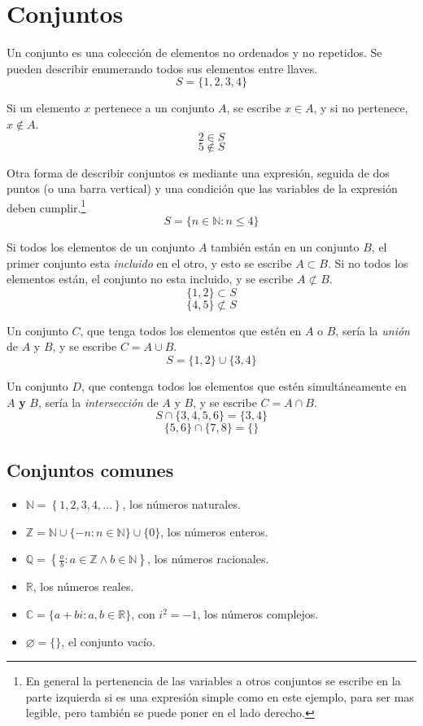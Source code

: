 \documentclass[../teoria.root.tex]{subfiles}
\begin{document}
\section{Conjuntos}

Un conjunto es una colección de elementos no ordenados y no repetidos. Se
pueden describir enumerando todos sus elementos entre llaves.
\[S=\{1,2,3,4\}\]

Si un elemento $x$ pertenece a un conjunto $A$, se escribe $x\in A$, y si no
pertenece, $x\notin A$.
\[2\in S\]
\[5\notin S\]

Otra forma de describir conjuntos es mediante una expresión, seguida de dos
puntos (o una barra vertical) y una condición que las variables de la expresión
deben cumplir.\footnote{En general la pertenencia de las variables a otros
conjuntos se escribe en la parte izquierda si es una expresión simple como en
este ejemplo, para ser mas legible, pero también se puede poner en el lado
derecho.}
\[S=\{n\in\mathbb{N}:n\leq4\}\]

Si todos los elementos de un conjunto $A$ también están en un conjunto $B$, el
primer conjunto esta \textit{incluido} en el otro, y esto se escribe $A\subset
B$. Si no todos los elementos están, el conjunto no esta incluido, y se escribe
$A\not\subset B$.
\[\{1,2\}\subset S\]
\[\{4,5\}\not\subset S\]

Un conjunto $C$, que tenga todos los elementos que estén en $A$ o $B$, sería la
\textit{unión} de $A$ y $B$, y se escribe $C=A\cup B$.
\[S=\{1,2\}\cup\{3,4\}\]

Un conjunto $D$, que contenga todos los elementos que estén simultáneamente en
$A$ \textbf{y} $B$, sería la \textit{intersección} de $A$ y $B$, y se escribe
$C=A\cap B$.
\[S\cap\{3,4,5,6\}=\{3,4\}\]
\[\{5,6\}\cap\{7,8\}=\{\}\]

\subsection{Conjuntos comunes}

\begin{itemize}
	\item $\mathbb{N}=\left\{1,2,3,4,\ldots\right\}$, los números naturales.
	\item $\mathbb{Z}=\mathbb{N}\cup\{-n:n\in\mathbb{N}\}\cup\{0\}$, los números enteros.
	\item $\mathbb{Q}=\left\{\frac{a}{b}:a\in\mathbb{Z}\land b\in\mathbb{N}\right\}$, los números racionales.
	\item $\mathbb{R}$, los números reales.
	\item $\mathbb{C}=\{a+bi:a,b\in\mathbb{R}\}$, con $i^2=-1$, los números complejos.
	\item $\varnothing=\{\}$, el conjunto vacío.
\end{itemize}
\end{document}
